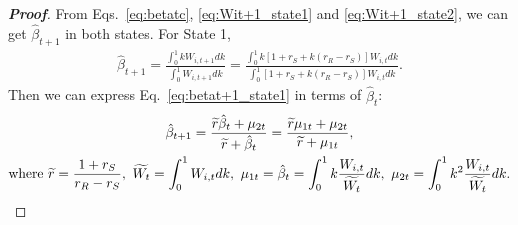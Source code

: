 \documentclass[11pt,a4paper]{article}
\begin{document}
\smallskip
	\begin{proof}[\textbf{Proof}]
		From Eqs.~\eqref{eq:betatc}, \eqref{eq:Wit+1_state1} and \eqref{eq:Wit+1_state2}, we can get $\hat\beta_{t+1}$ in both states. For State 1, 
		\begin{eqnarray}\label{eq:betat+1_state1}
			\hat\beta_{t+1} = \frac{\int_0^1 kW_{i,t+1}dk}{\int_0^1 W_{i,t+1}dk}
			=\frac{\int_0^1 k[1+r_S+k(r_R-r_S)]W_{i,t}dk}{\int_0^1[1+r_S+k(r_R-r_S)]W_{i,t}dk}.
		\end{eqnarray}
		Then we can express Eq.~\eqref{eq:betat+1_state1} in terms of $\hat\beta_t$:
		\begin{gather}
			\hat\beta_{t+1}  = \frac{\widetilde r \hat\beta_t + \mu_{2t}}{\widetilde r +\hat\beta_t}= \frac{\widetilde r \mu_{1t} + \mu_{2t}}{\widetilde r +\mu_{1t}}, \notag\\
			\text{where}~\widetilde r=\frac{1+r_S}{r_R-r_S},~\widetilde{W_t}=\int_0^1 W_{i,t}dk,~\mu_{1t}=\hat\beta_t=\int_0^1 k \frac{W_{i,t}}{\widetilde{W_t}}dk,~\mu_{2t}=\int_0^1 k^2 \frac{W_{i,t}}{\widetilde{W_t}}dk.\notag
		\end{gather}


\end{proof}
\end{document}
